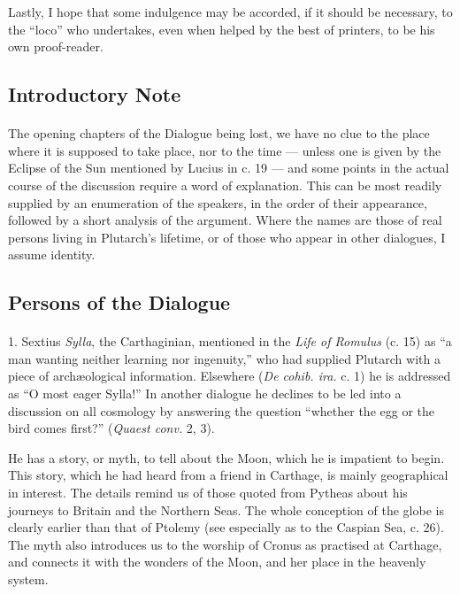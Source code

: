 \documentclass[a4paper, 11pt, oneside, polutonikogreek, english]{article}
\begin{document}
Lastly, I hope that some indulgence may be accorded, if it should be necessary, to the ``loco'' who undertakes, even when helped by the best of printers, to be his own proof-reader.

\subsection*{Introductory Note}
\paragraph{}
The opening chapters of the Dialogue being lost, we have no clue to the place where it is supposed to take place, nor to the time --- unless one is given by the Eclipse of the Sun mentioned by Lucius in c. 19 --- and some points in the actual course of the discussion require a word of explanation. This can be most readily supplied by an enumeration of the speakers, in the order of their appearance, followed by a short analysis of the argument. Where the names are those of real persons living in Plutarch's lifetime, or of those who appear in other dialogues, I assume identity.

\subsection*{Persons of the Dialogue}
\paragraph{}
1. Sextius \emph{Sylla}, the Carthaginian, mentioned in the \emph{Life of Romulus} (c. 15) as ``a man wanting neither learning nor ingenuity,'' who had supplied Plutarch with a piece of archæological information. Elsewhere (\emph{De cohib. ira.} c. 1) he is addressed as ``O most eager Sylla!'' In another dialogue he declines to be led into a discussion on all cosmology by answering the question ``whether the egg or the bird comes first?'' (\emph{Quaest conv.} 2, 3).

He has a story, or myth, to tell about the Moon, which he is impatient to begin. This story, which he had heard from a friend in Carthage, is mainly geographical in interest. The details remind us of those quoted from Pytheas about his journeys to Britain and the Northern Seas. The whole conception of the globe is clearly earlier than that of Ptolemy (see especially as to the Caspian Sea, c. 26). The myth also introduces us to the worship of Cronus as practised at Carthage, and connects it with the wonders of the Moon, and her place in the heavenly system.
\end{document}
